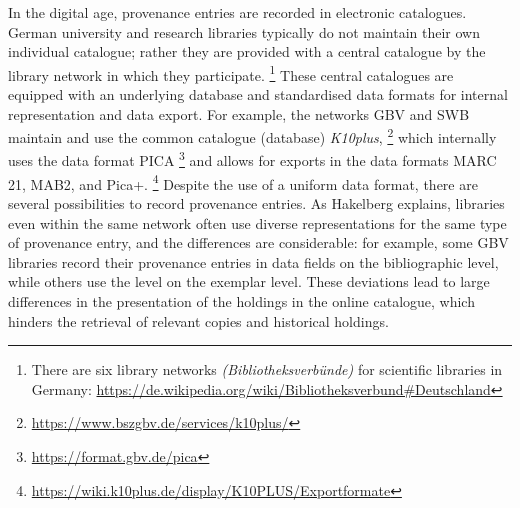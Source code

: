 In the digital age, provenance entries are recorded in electronic catalogues.
German university and research libraries typically do not 
maintain their own individual catalogue; rather they are provided with a central
catalogue by the library network in which they participate.%
\footnote{%
  There are six library networks \emph{(Bibliotheksverbünde)} for scientific libraries
  in Germany: \url{https://de.wikipedia.org/wiki/Bibliotheksverbund\#Deutschland}%
}
These central catalogues are equipped with an underlying database
and standardised data formats for internal representation and data export.
For example, the networks GBV and SWB maintain and use the common catalogue (database)
\emph{K10plus},%
\footnote{\url{https://www.bszgbv.de/services/k10plus/}}
which internally uses the data format PICA%
\footnote{\url{https://format.gbv.de/pica}}
and allows for exports in the data formats
MARC 21, MAB2, and Pica+.%
\footnote{\url{https://wiki.k10plus.de/display/K10PLUS/Exportformate}}
Despite the use of a uniform data format,
there are several possibilities to record provenance entries.
As Hakelberg \autocite*[Chapter~4]{Hakelberg2016} explains,
libraries even within the same network often use diverse representations
for the same type of provenance entry, and the differences are considerable:
for example, some GBV libraries record their provenance entries
in data fields on the bibliographic level,
while others use the level on the exemplar level.
These deviations lead to large differences in the presentation
of the holdings in the online catalogue,
which hinders the retrieval of relevant copies and historical holdings.

